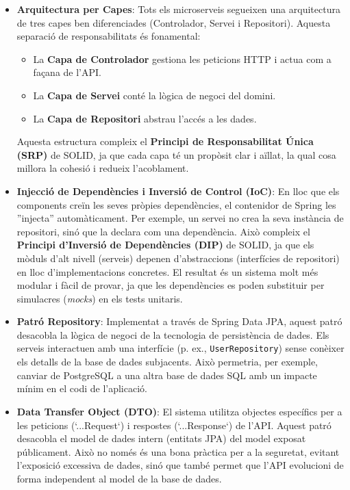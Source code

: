 \begin{itemize}
    \item \textbf{Arquitectura per Capes}: Tots els microserveis segueixen una arquitectura de tres capes ben diferenciades (Controlador, Servei i Repositori). Aquesta separació de responsabilitats és fonamental:
    \begin{itemize}
        \item La \textbf{Capa de Controlador} gestiona les peticions HTTP i actua com a façana de l'API.
        \item La \textbf{Capa de Servei} conté la lògica de negoci del domini.
        \item La \textbf{Capa de Repositori} abstrau l'accés a les dades.
    \end{itemize}
    Aquesta estructura compleix el \textbf{Principi de Responsabilitat Única (SRP)} de SOLID, ja que cada capa té un propòsit clar i aïllat, la qual cosa millora la cohesió i redueix l'acoblament.

    \item \textbf{Injecció de Dependències i Inversió de Control (IoC)}: En lloc que els components creïn les seves pròpies dependències, el contenidor de Spring les ''injecta'' automàticament. Per exemple, un servei no crea la seva instància de repositori, sinó que la declara com una dependència. Això compleix el \textbf{Principi d'Inversió de Dependències (DIP)} de SOLID, ja que els mòduls d'alt nivell (serveis) depenen d'abstraccions (interfícies de repositori) en lloc d'implementacions concretes. El resultat és un sistema molt més modular i fàcil de provar, ja que les dependències es poden substituir per simulacres (\textit{mocks}) en els tests unitaris.

    \item \textbf{Patró Repository}: Implementat a través de Spring Data JPA, aquest patró desacobla la lògica de negoci de la tecnologia de persistència de dades. Els serveis interactuen amb una interfície (p. ex., \texttt{UserRepository}) sense conèixer els detalls de la base de dades subjacents. Això permetria, per exemple, canviar de PostgreSQL a una altra base de dades SQL amb un impacte mínim en el codi de l'aplicació.

    \item \textbf{Data Transfer Object (DTO)}: El sistema utilitza objectes específics per a les peticions (`...Request`) i respostes (`...Response`) de l'API. Aquest patró desacobla el model de dades intern (entitats JPA) del model exposat públicament. Això no només és una bona pràctica per a la seguretat, evitant l'exposició excessiva de dades, sinó que també permet que l'API evolucioni de forma independent al model de la base de dades.
\end{itemize}


